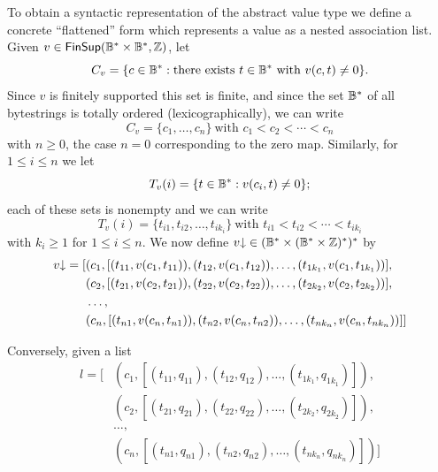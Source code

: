 \noindent To obtain a syntactic representation of the abstract value type
we define a concrete ``flattened'' form which represents a value as a
nested association list.  Given $v \in \mathsf{FinSup}(\mathbb{B}^* \times \mathbb{B}^*, \mathbb{Z})$,
let
$$C_v
= \{c \in \mathbb{B}^*: \text{there exists $t \in \mathbb{B}^*$ with $v(c,t) \neq 0\}$.}
$$
\noindent
Since $v$ is finitely supported this set is finite, and since the set $\mathbb{B}^*$ of
all bytestrings is totally ordered (lexicographically), we can write
$$
 C_v = \{c_1, \ldots, c_n\}\ \text{with $c_1 < c_2 < \cdots < c_n$}
$$
\noindent with $n\geq 0$, the case $n=0$ corresponding to the zero map.
Similarly, for $1 \leq i \leq n$ we let
$$T_v(i) = \{t \in \mathbb{B}^*: v(c_i,t) \neq 0\};
$$
\noindent
each of these sets is nonempty and we can write
$$
   T_v(i) = \{t_{i1}, t_{i2}, \ldots, t_{ik_i}\}\ \text{with $t_{i1} < t_{i2} < \cdots < t_{ik_i}$}
$$
\noindent with $k_i \geq 1$ for $1 \leq i \leq n$. We now define $\flatten{v} \in (\B^* \times (\B^* \times \Z)^*)^*$ by
\begin{align*}
 \flatten{v} =
 [&(c_1, [(t_{11}, v(c_1, t_{11})), (t_{12}, v(c_1, t_{12})), \ldots, (t_{1k_1}, v(c_1, t_{1k_1}))],\\
  &(c_2, [(t_{21}, v(c_2, t_{21})), (t_{22}, v(c_2, t_{22})), \ldots, (t_{2k_2}, v(c_2, t_{2k_2}))],\\
  &\ldots,\\
  &(c_n, [(t_{n1}, v(c_n, t_{n1})), (t_{n2}, v(c_n, t_{n2})), \ldots, (t_{nk_n}, v(c_n, t_{nk_n}))]]
\end{align*}%

\noindent
Conversely, given a list
\begin{align*}
 l =  [&(c_1, [(t_{11}, q_{11}), (t_{12}, q_{12}), \ldots, (t_{1k_1}, q_{1k_1})]),\\
       &(c_2, [(t_{21}, q_{21}), (t_{22}, q_{22}), \ldots, (t_{2k_2}, q_{2k_2})]),\\
       &\ldots,\\
       &(c_n, [(t_{n1}, q_{n1}), (t_{n2}, q_{n2}), \ldots, (t_{nk_n}, q_{nk_n})])]
\end{align*}

